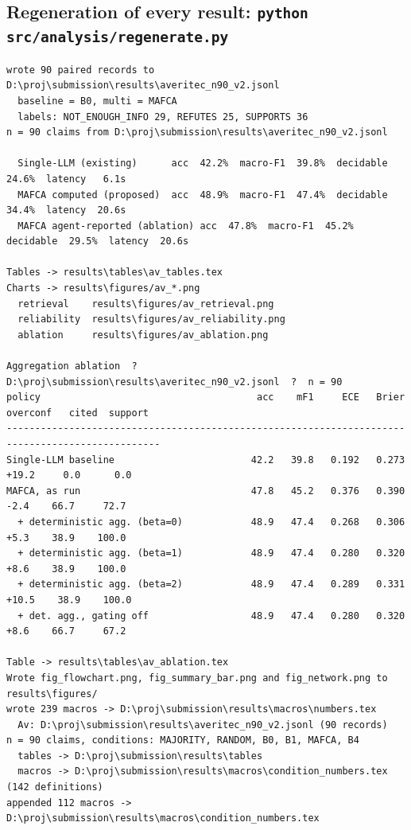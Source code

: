 \documentclass[11pt,a4paper]{article}
\begin{document}
\subsection{Regeneration of every result: \texttt{python src/analysis/regenerate.py}}
\begin{small}\begin{verbatim}
wrote 90 paired records to D:\proj\submission\results\averitec_n90_v2.jsonl
  baseline = B0, multi = MAFCA
  labels: NOT_ENOUGH_INFO 29, REFUTES 25, SUPPORTS 36
n = 90 claims from D:\proj\submission\results\averitec_n90_v2.jsonl

  Single-LLM (existing)      acc  42.2%  macro-F1  39.8%  decidable  24.6%  latency   6.1s
  MAFCA computed (proposed)  acc  48.9%  macro-F1  47.4%  decidable  34.4%  latency  20.6s
  MAFCA agent-reported (ablation) acc  47.8%  macro-F1  45.2%  decidable  29.5%  latency  20.6s

Tables -> results\tables\av_tables.tex
Charts -> results\figures/av_*.png
  retrieval    results\figures/av_retrieval.png
  reliability  results\figures/av_reliability.png
  ablation     results\figures/av_ablation.png

Aggregation ablation  ?  D:\proj\submission\results\averitec_n90_v2.jsonl  ?  n = 90
policy                                      acc    mF1     ECE   Brier  overconf   cited  support
-------------------------------------------------------------------------------------------------
Single-LLM baseline                        42.2   39.8   0.192   0.273     +19.2     0.0      0.0
MAFCA, as run                              47.8   45.2   0.376   0.390      -2.4    66.7     72.7
  + deterministic agg. (beta=0)            48.9   47.4   0.268   0.306      +5.3    38.9    100.0
  + deterministic agg. (beta=1)            48.9   47.4   0.280   0.320      +8.6    38.9    100.0
  + deterministic agg. (beta=2)            48.9   47.4   0.289   0.331     +10.5    38.9    100.0
  + det. agg., gating off                  48.9   47.4   0.280   0.320      +8.6    66.7     67.2

Table -> results\tables\av_ablation.tex
Wrote fig_flowchart.png, fig_summary_bar.png and fig_network.png to results\figures/
wrote 239 macros -> D:\proj\submission\results\macros\numbers.tex
  Av: D:\proj\submission\results\averitec_n90_v2.jsonl (90 records)
n = 90 claims, conditions: MAJORITY, RANDOM, B0, B1, MAFCA, B4
  tables -> D:\proj\submission\results\tables
  macros -> D:\proj\submission\results\macros\condition_numbers.tex  (142 definitions)
appended 112 macros -> D:\proj\submission\results\macros\condition_numbers.tex


\end{verbatim}
\end{small}
\end{document}
